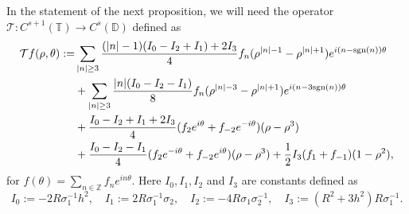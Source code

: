 \documentclass[12pt,reqno]{amsart}
\numberwithin{equation}{section}
\theoremstyle{definition}
\theoremstyle{remark}
\begin{document}
In the statement of the next proposition, we will need the operator
 $\mathcal{T} : C^{s+1}(\mathbb{T}) \to C^{s}(\mathbb{D})$ defined as
\begin{align*}
\mathcal{T}f(\rho,\theta):=&\sum_{|n|\ge3}\frac{(|n|-1)(I_0-I_2+I_1)+2I_3}{4}f_n
(\rho^{|n|-1}-\rho^{|n|+1})e^{i(n-\text{sgn} (n))\theta}\notag\\
&+\sum_{|n|\ge3}\frac{|n|(I_0-I_2-I_1)}{8}f_n
(\rho^{|n|-3}-\rho^{|n|+1})e^{i(n-3\text{sgn} (n))\theta}\notag\\
&+\frac{I_0-I_2+I_1+2I_3}{4}(f_2e^{i\theta}+f_{-2}e^{-i\theta})(\rho-\rho^3)\notag\\
&+\frac{I_0-I_2-I_1}{4}(f_2e^{-i\theta}+f_{-2}e^{i\theta})(\rho-\rho^3)
+\frac12I_3(f_1+f_{-1})(1-\rho^2),\notag
\end{align*}
 for $f(\theta) = \sum_{n\in\mathbb{Z}} f_n e^{in\theta}$. Here $ I_0,I_1,I_2 $ and $ I_3 $ are constants defined as 
\begin{equation*} 
I_0:=-2R\sigma_1^{-1}h^2,
\quad I_1:=2R\sigma_1^{-1}\sigma_2,
\quad I_2:=-4R\sigma_1\sigma_2^{-1},
\quad I_3:=(R^2+3h^2)R\sigma_1^{-1}.
\end{equation*}
 
\end{document}
